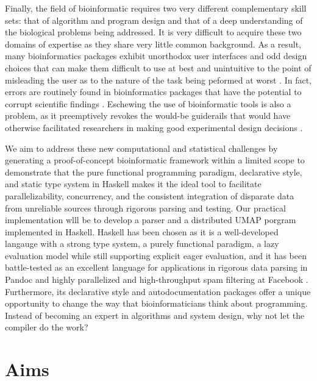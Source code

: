 \documentclass[11pt,letterpaper]{article}
\begin{document}
Finally, the field of bioinformatic requires two very different
complementary skill sets: that of algorithm and program design and
that of a deep understanding of the biological problems being
addressed. It is very difficult to acquire these two domains of
expertise as they share very little common background. As a result,
many bioinformatics packages exhibit unorthodox user interfaces and
odd design choices that can make them difficult to use at best and
unintuitive to the point of misleading the user as to the nature of
the task being peformed at worst \parencite{shah2019misunderstood}. In
fact, errors are routinely found in bioinformatics packages that have
the potential to corrupt scientific findings
\parencite{chen2009innovative}. Eschewing the use of bioinformatic
tools is also a problem, as it preemptively revokes the would-be
guiderails that would have otherwise facilitated researchers in making
good experimental design decisions \parencite{biron2006pitfalls}.

We aim to address these new computational and statistical challenges
by generating a proof-of-concept bioinformatic framework within a
limited scope to demonstrate that the pure functional programming
paradigm, declarative style, and static type system in Haskell makes
it the ideal tool to facilitate parallelizability, concurrency, and
the consistent integration of disparate data from unreliable sources
through rigorous parsing and testing. Our practical implementation
wlll be to develop a parser and a distributed UMAP porgram implemented
in Haskell. Haskell has been chosen as it is a well-developed langauge
with a strong type system, a purely functional paradigm, a lazy
evaluation model while still supporting explicit eager evaluation, and
it has been battle-tested as an excellent language for applications in
rigorous data parsing in Pandoc \parencite{krijnen2014expand} and
highly parallelized and high-throughput spam filtering at Facebook
\parencites{fbFightingSpam,arvidsson2014actors}. Furthermore, its
declarative style and autodocumentation packages offer a unique
opportunity to change the way that bioinformaticians think about
programming. Instead of becoming an expert in algorithms and system
design, why not let the compiler do the work?



\section{Aims}
\end{document}
